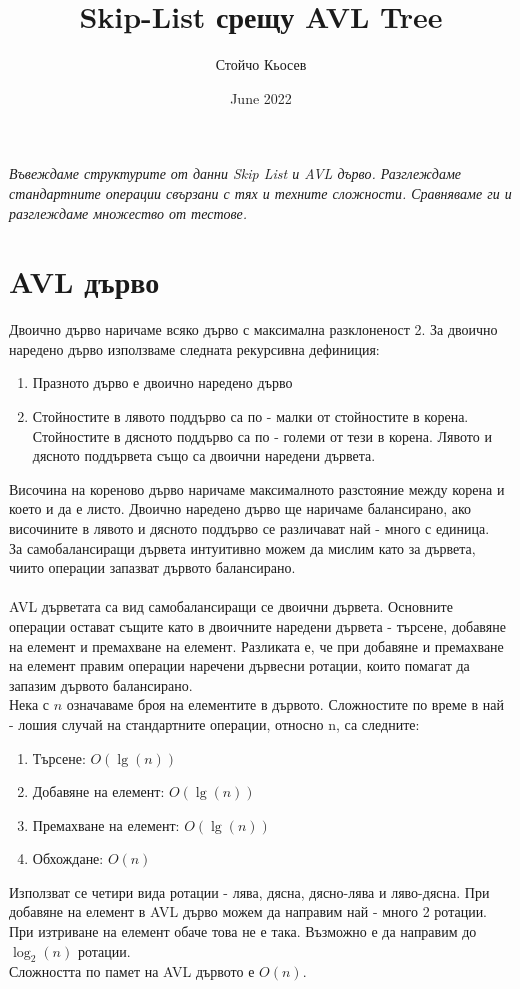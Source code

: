 \documentclass[a4paper,12pt,fleqn]{article}
\title{Skip-List срещу AVL Tree}
\author{Стойчо Кьосев}
\date{June 2022}
\begin{document}
	\maketitle
	\textit{Въвеждаме структурите от данни Skip List и AVL дърво. Разглеждаме стандартните операции свързани с тях и техните сложности. Сравняваме ги и разглеждаме множество от тестове.}
	
	\section{AVL дърво}
	Двоично дърво наричаме всяко дърво с максимална разклоненост 2.
	За двоично наредено дърво използваме следната рекурсивна дефиниция:
	\begin{enumerate}
		\item Празното дърво е двоично наредено дърво
		\item Стойностите в лявото поддърво са по - малки от стойностите в корена. Стойностите в дясното поддърво са по - големи от тези в корена. Лявото и дясното поддървета също са двоични наредени дървета.
	\end{enumerate}
	Височина на кореново дърво наричаме максималното разстояние между корена и което и да е листо.
	Двоично наредено дърво ще наричаме балансирано, ако височините в лявото и дясното поддърво се различават най - много с единица.\\
	За самобалансиращи дървета интуитивно можем да мислим като за дървета, чиито операции запазват дървото балансирано.\\
	\\AVL дърветата са вид самобалансиращи се двоични дървета. Основните операции остават същите като в двоичните наредени дървета - търсене, добавяне на елемент и премахване на елемент. Разликата е, че при добавяне и премахване на елемент правим операции наречени дървесни ротации, които помагат да запазим дървото балансирано. 
	\\Нека с $n$ означаваме броя на елементите в дървото. Сложностите по време в най - лошия случай на стандартните операции, относно n, са следните:
	\begin{enumerate}
		\item Търсене: $O(\lg(n))$
		\item Добавяне на елемент: $O(\lg(n))$
		\item Премахване на елемент: $O(\lg(n))$
		\item Обхождане: $O(n)$
	\end{enumerate}
	Използват се четири вида ротации - лява, дясна, дясно-лява и ляво-дясна. При добавяне на елемент в AVL дърво можем да направим най - много 2 ротации. При изтриване на елемент обаче това не е така. Възможно е да направим до $\log_2(n)$ ротации.\\
	Сложността по памет на AVL дървото е $O(n)$.
\end{document}
